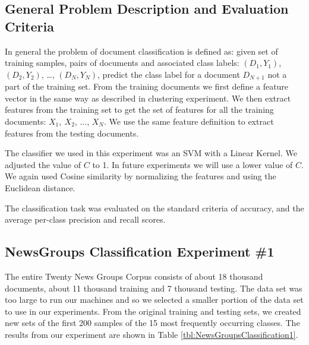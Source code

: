\documentclass[11pt]{article}
\begin{document}
\subsection{General Problem Description and Evaluation Criteria}

In general the problem of document classification is defined as: given set of training samples, pairs of documents and associated class labels: $(D_1, Y_1)$, $(D_2, Y_2)$, \dots, $(D_N, Y_N)$, predict the class label for a document $D_{N+1}$ not a part of the training set. From the training documents we first define a feature vector in the same way as described in clustering experiment. We then extract features from the training set to get the set of features for all the training documents: $X_1,\ X_2$, $\dots$, $X_N$. We use the same feature definition to extract features from the testing documents. 

The classifier we used in this experiment was an SVM with a Linear Kernel. We adjusted the value of $C$ to 1. In future experiments we will use a lower value of $C$. We again used Cosine similarity by normalizing the features and using the Euclidean distance.  

The classification task was evaluated on the standard criteria of accuracy, and the average per-class precision and recall scores.

\subsection{NewsGroups Classification Experiment \#1}

The entire Twenty News Groups Corpus consists of about 18 thousand documents, about 11 thousand training and 7 thousand testing. The data set was too large to run our machines and so we selected a smaller portion of the data set to use in our experiments. From the original training and testing sets, we created new sets of the first 200 samples of the 15 most frequently occurring classes. The results from our experiment are shown in Table \ref{tbl:NewsGroupsClassification1}.
\end{document}
